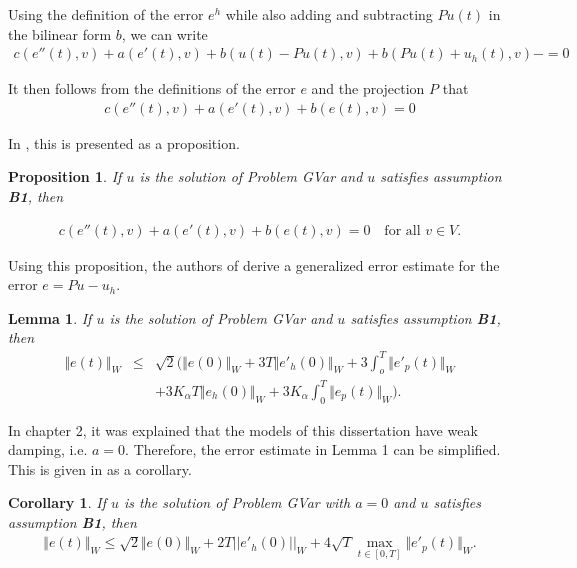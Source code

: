 \documentclass[../../main.tex]{subfiles}
\begin{document}
Using the definition of the error $e^h$ while also adding and subtracting $Pu(t)$ in the bilinear form $b$, we can write
\begin{eqnarray*}
	c(e''(t),v) + a(e'(t),v) + b(u(t) - Pu(t),v) + b(Pu(t) +u_h(t),v)- = 0
\end{eqnarray*}

It then follows from the definitions of the error $e$ and the projection $P$ that
\begin{eqnarray*}
	c(e''(t),v) + a(e'(t),v) + b(e(t),v) = 0
\end{eqnarray*}

In \cite{BV13}, this is presented as a proposition.
\newtheorem{DC_Prop1}{Proposition}
\begin{DC_Prop1}
	If $u$ is the solution of Problem GVar and $u$ satisfies assumption \textbf{B1}, then

	\begin{eqnarray}
		c(e''(t),v) + a(e'(t),v) + b(e(t),v) = 0 \ \ \ \textrm{ for all } v \in V.
	\end{eqnarray}
\end{DC_Prop1}

Using this proposition, the authors of \cite{BV13} derive a generalized error estimate for the error $e = Pu - u_h$.

\newtheorem{lem_1}{Lemma}
\begin{lem_1}
	If $u$ is the solution of Problem GVar and $u$ satisfies assumption \textbf{B1}, then
	\begin{eqnarray}
		\Vert e(t)\Vert_{W} &\leq& \sqrt{2} \biggl( \Vert e(0) \Vert_W + 3T\Vert e'_h(0) \Vert_W + 3 \int_o^T \Vert e'_p(t)\Vert_W\nonumber \\
		&& + 3K_\alpha T \Vert e_h(0) \Vert_W + 3K_\alpha \int_0^T \Vert e_p(t) \Vert_W \biggr). \label{fundamental_estimate}
	\end{eqnarray}
\end{lem_1}

In chapter 2, it was explained that the models of this dissertation have weak damping, i.e. $a = 0$. Therefore, the error estimate in Lemma 1 can be simplified. This is given in \cite{BV13} as a corollary.

\newtheorem{col_1}{Corollary}
\begin{col_1}
	If $u$ is the solution of Problem GVar with $a = 0$ and $u$ satisfies assumption \textbf{B1}, then
	\begin{eqnarray}
		\Vert e(t)\Vert_{W} \leq \sqrt{2} \Vert e(0) \Vert_W + 2T||e'_h(0)||_W + 4\sqrt{T}\max_{t \in [0,T]} \Vert e'_p(t) \Vert_W.
	\end{eqnarray}
\end{col_1}
\end{document}
